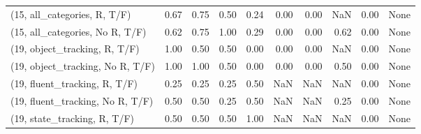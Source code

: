 \begin{table*}[h!]
\begin{adjustbox}{width=2\columnwidth,center}
\begin{tabular}{lrrr|rrr|rrr}
(15, all\_categories, R, T/F)          &                      0.67 &                  0.75 &                      0.50 &                          0.24 &                      0.00 &                          0.00 &                                    NaN &                               0.00 &                                  None \\
(15, all\_categories, No R, T/F)       &                      0.62 &                  0.75 &                      1.00 &                          0.29 &                      0.00 &                          0.00 &                                   0.62 &                               0.00 &                                  None \\



\midrule
(19, object\_tracking, R, T/F)         &                      1.00 &                  0.50 &                      0.50 &                          0.00 &                      0.00 &                          0.00 &                                    NaN &                               0.00 &                                  None \\
(19, object\_tracking, No R, T/F)      &                      1.00 &                  1.00 &                      0.50 &                          0.00 &                      0.00 &                          0.00 &                                   0.50 &                               0.00 &                                  None \\
(19, fluent\_tracking, R, T/F)         &                      0.25 &                  0.25 &                      0.25 &                          0.50 &                       NaN &                           NaN &                                    NaN &                               0.00 &                                  None \\
(19, fluent\_tracking, No R, T/F)      &                      0.50 &                  0.50 &                      0.25 &                          0.50 &                       NaN &                           NaN &                                   0.25 &                               0.00 &                                  None \\
(19, state\_tracking, R, T/F)          &                      0.50 &                  0.50 &                      0.50 &                          1.00 &                       NaN &                           NaN &                                    NaN &                               0.00 &                                  None \\

\end{tabular}
\end{adjustbox}
\end{table*}
